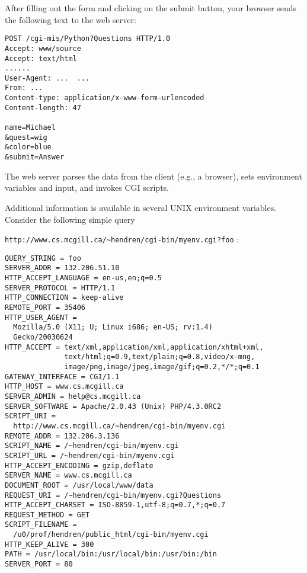 \begin{slide*}
After filling out the form and clicking on the submit button, your browser
sends the following text to the web server:\\

\begin{scriptsize}
\begin{verbatim}
POST /cgi-mis/Python?Questions HTTP/1.0
Accept: www/source
Accept: text/html
......
User-Agent: ...  ...
From: ...
Content-type: application/x-www-form-urlencoded
Content-length: 47

name=Michael
&quest=wig
&color=blue
&submit=Answer
\end{verbatim}
\end{scriptsize}
\vfil
\end{slide*}

\begin{slide*}
The web server parses the data from the client (e.g., a browser), 
sets environment variables and input, and invokes CGI scripts.

Additional information is available in several UNIX environment
variables.  Consider the following simple query

{\scriptsize
  \verb+http://www.cs.mcgill.ca/~hendren/cgi-bin/myenv.cgi?foo+} :\\

\begin{scriptsize}
\begin{verbatim}
QUERY_STRING = foo 
SERVER_ADDR = 132.206.51.10
HTTP_ACCEPT_LANGUAGE = en-us,en;q=0.5
SERVER_PROTOCOL = HTTP/1.1
HTTP_CONNECTION = keep-alive
REMOTE_PORT = 35406
HTTP_USER_AGENT = 
  Mozilla/5.0 (X11; U; Linux i686; en-US; rv:1.4)
  Gecko/20030624
HTTP_ACCEPT = text/xml,application/xml,application/xhtml+xml,
              text/html;q=0.9,text/plain;q=0.8,video/x-mng,
              image/png,image/jpeg,image/gif;q=0.2,*/*;q=0.1
GATEWAY_INTERFACE = CGI/1.1
HTTP_HOST = www.cs.mcgill.ca
SERVER_ADMIN = help@cs.mcgill.ca
SERVER_SOFTWARE = Apache/2.0.43 (Unix) PHP/4.3.0RC2
SCRIPT_URI = 
  http://www.cs.mcgill.ca/~hendren/cgi-bin/myenv.cgi
REMOTE_ADDR = 132.206.3.136
SCRIPT_NAME = /~hendren/cgi-bin/myenv.cgi
SCRIPT_URL = /~hendren/cgi-bin/myenv.cgi
HTTP_ACCEPT_ENCODING = gzip,deflate
SERVER_NAME = www.cs.mcgill.ca
DOCUMENT_ROOT = /usr/local/www/data
REQUEST_URI = /~hendren/cgi-bin/myenv.cgi?Questions
HTTP_ACCEPT_CHARSET = ISO-8859-1,utf-8;q=0.7,*;q=0.7
REQUEST_METHOD = GET
SCRIPT_FILENAME = 
  /u0/prof/hendren/public_html/cgi-bin/myenv.cgi
HTTP_KEEP_ALIVE = 300
PATH = /usr/local/bin:/usr/local/bin:/usr/bin:/bin
SERVER_PORT = 80
\end{verbatim}
\end{scriptsize}
\vfil
\end{slide*}

